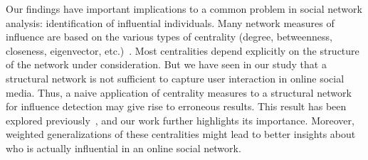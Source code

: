 


Our findings have important implications to a common problem in social network analysis: identification of influential individuals. Many network measures of influence are based on the various types of centrality (degree, betweenness, closeness, eigenvector, etc.)~\cite{newman2009networks}. Most centralities depend explicitly on the structure of the network under consideration. But we have seen in our study that a structural network is not sufficient to capture user interaction in online social media. Thus, a naive application of centrality measures to a structural network for influence detection may give rise to erroneous results. This result has been explored previously~\cite{kitsak2010identification}, and our work further highlights its importance. Moreover, weighted generalizations of these centralities might lead to better insights about who is actually influential in an online social network.

